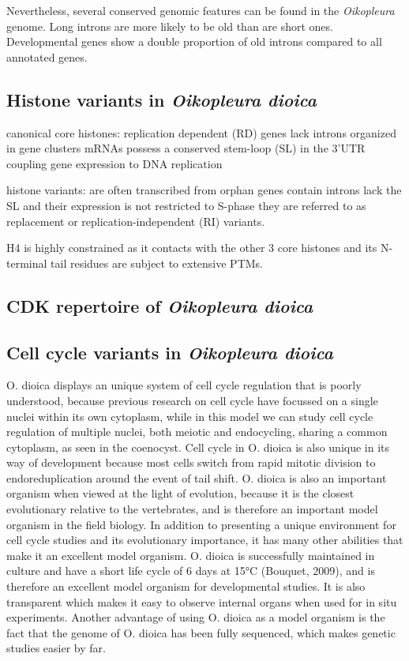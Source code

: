 \documentclass[11pt,twoside,a4paper]{report}
\begin{document}
		Nevertheless, several conserved genomic features can be found in the \textit{Oikopleura} genome.
		Long introns are more likely to be old than are short ones.
		Developmental genes show a double proportion of old introns compared to all annotated genes.
		
		
		\subsection{Histone variants in \textit{Oikopleura dioica}}
		\cite{Moosmann2011}

canonical core histones:
	replication dependent (RD) genes
	lack introns
	organized in gene clusters
	mRNAs possess a conserved stem-loop (SL) in the 3’UTR coupling gene expression to DNA replication

histone variants:
	are often transcribed from orphan genes
	contain introns
	lack the SL and their expression is not restricted to S-phase
	they are referred to as replacement or replication-independent (RI) variants.

H4 is highly constrained as it contacts with the other 3 core histones and its N-terminal tail residues are subject to extensive PTMs.
			
		\subsection{CDK repertoire of \textit{Oikopleura dioica}}
		
		\subsection{Cell cycle variants in \textit{Oikopleura dioica}}
		\label{subsection:CellCycleVariants}
		O. dioica displays an unique system of cell cycle regulation that is poorly understood, because previous research on cell cycle have focussed on a single nuclei within its own cytoplasm, while in this model we can study cell cycle regulation of multiple nuclei, both meiotic and endocycling, sharing a common cytoplasm, as seen in the coenocyst. Cell cycle in O. dioica is also unique in its way of development because most cells switch from rapid mitotic division to endoreduplication around the event of tail shift. O. dioica is also an important organism when viewed at the light of evolution, because it is the closest evolutionary relative to the vertebrates, and is therefore an important model organism in the field biology. In addition to presenting a unique environment for cell cycle studies and its evolutionary importance, it has many other abilities that make it an excellent model organism. O. dioica is successfully maintained in culture and have a short life cycle of 6 days at 15°C (Bouquet, 2009), and is therefore an excellent model organism for developmental studies. It is also transparent which makes it easy to observe internal organs when used for in situ experiments. Another advantage of using O. dioica as a model organism is the fact that the genome of O. dioica has been fully sequenced, which makes genetic studies easier by far.
		
\end{document}
